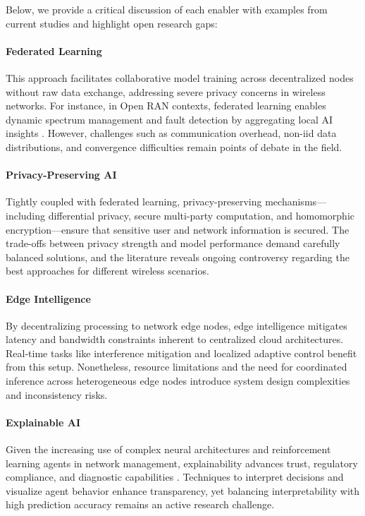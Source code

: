 \documentclass[sigconf]{acmart}
\begin{document}
Below, we provide a critical discussion of each enabler with examples from current studies and highlight open research gaps:

\paragraph{Federated Learning} This approach facilitates collaborative model training across decentralized nodes without raw data exchange, addressing severe privacy concerns in wireless networks. For instance, in Open RAN contexts, federated learning enables dynamic spectrum management and fault detection by aggregating local AI insights \cite{ref49}. However, challenges such as communication overhead, non-iid data distributions, and convergence difficulties remain points of debate in the field.

\paragraph{Privacy-Preserving AI} Tightly coupled with federated learning, privacy-preserving mechanisms—including differential privacy, secure multi-party computation, and homomorphic encryption—ensure that sensitive user and network information is secured. The trade-offs between privacy strength and model performance demand carefully balanced solutions, and the literature reveals ongoing controversy regarding the best approaches for different wireless scenarios.

\paragraph{Edge Intelligence} By decentralizing processing to network edge nodes, edge intelligence mitigates latency and bandwidth constraints inherent to centralized cloud architectures. Real-time tasks like interference mitigation and localized adaptive control benefit from this setup. Nonetheless, resource limitations and the need for coordinated inference across heterogeneous edge nodes introduce system design complexities and inconsistency risks.

\paragraph{Explainable AI} Given the increasing use of complex neural architectures and reinforcement learning agents in network management, explainability advances trust, regulatory compliance, and diagnostic capabilities \cite{ref50}. Techniques to interpret decisions and visualize agent behavior enhance transparency, yet balancing interpretability with high prediction accuracy remains an active research challenge.
\end{document}
